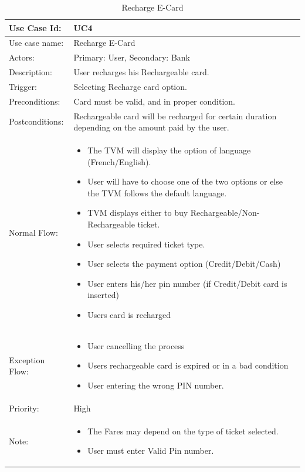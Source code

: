\documentclass[11pt,oneside]{book}
\begin{document}
\begin{table}[h]
\centering
\begin{tabular}{|p{2.4cm}|p{11cm}|}
\hline
{Use Case Id: } & {UC4} \\
\hline
{Use case name:} & {Recharge E-Card}\\
\hline
{Actors: } & {Primary: User, Secondary: Bank}\\
\hline
{Description:} & {User recharges his Rechargeable card.}\\
\hline
 
{Trigger:  } & {Selecting Recharge card option.}\\
\hline
{Preconditions:  } & {Card must be valid, and in proper condition.}\\
\hline
{Postconditions:} & {Rechargeable card will be recharged for certain duration depending on the amount paid by the user.}\\
\hline
{Normal Flow: } & {
\begin{itemize}
\item	The TVM will display the option of language (French/English).
\item	User will have to choose one of the two options or else the TVM follows the default language.
\item	TVM displays either to buy Rechargeable/Non-Rechargeable ticket.
\item	User selects required ticket type.
\item	User selects the payment option (Credit/Debit/Cash)
\item	User enters his/her pin number (if Credit/Debit card is inserted)
\item	Users card is recharged

 
\end{itemize}
}\\
\hline
{Exception Flow: } & {
\begin{itemize}
\item	User cancelling the process
\item	Users rechargeable card is expired or in a bad condition
\item	User entering the wrong PIN number.
\end{itemize}
}\\
\hline
{Priority:  } & {High}\\
\hline
{Note:  } & {
\begin{itemize}
\item	The Fares may depend on the type of ticket selected.
\item	User must enter Valid Pin number.
\end{itemize}}\\
\hline
\end{tabular}
\caption{Recharge E-Card}
\end{table}
\end{document}
